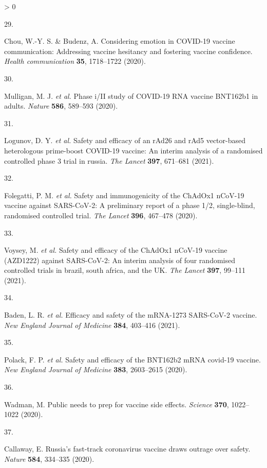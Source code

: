 \documentclass[
  12pt,
]{article}
\newlength{\cslhangindent}
\newlength{\csllabelwidth}
\newenvironment{CSLReferences}[2] %
 {%
  \setlength{\parindent}{0pt}
  \ifodd #1 \everypar{\setlength{\hangindent}{\cslhangindent}}\ignorespaces\fi
  \ifnum #2 > 0
  \setlength{\parskip}{#2\baselineskip}
  \fi
 }%
 {}
\newcommand{\CSLLeftMargin}[1]{\parbox[t]{\csllabelwidth}{#1}}
\newcommand{\CSLRightInline}[1]{\parbox[t]{\linewidth - \csllabelwidth}{#1}\break}
\begin{document}
\begin{CSLReferences}{0}{0}
\leavevmode\hypertarget{ref-chou2020considering}{}%
\CSLLeftMargin{29. }
\CSLRightInline{Chou, W.-Y. S. \& Budenz, A. Considering emotion in COVID-19 vaccine communication: Addressing vaccine hesitancy and fostering vaccine confidence. \emph{Health communication} \textbf{35}, 1718--1722 (2020).}

\leavevmode\hypertarget{ref-mulligan2020phase}{}%
\CSLLeftMargin{30. }
\CSLRightInline{Mulligan, M. J. \emph{et al.} Phase i/II study of COVID-19 RNA vaccine BNT162b1 in adults. \emph{Nature} \textbf{586}, 589--593 (2020).}

\leavevmode\hypertarget{ref-logunov2021safety}{}%
\CSLLeftMargin{31. }
\CSLRightInline{Logunov, D. Y. \emph{et al.} Safety and efficacy of an rAd26 and rAd5 vector-based heterologous prime-boost COVID-19 vaccine: An interim analysis of a randomised controlled phase 3 trial in russia. \emph{The Lancet} \textbf{397}, 671--681 (2021).}

\leavevmode\hypertarget{ref-folegatti2020safety}{}%
\CSLLeftMargin{32. }
\CSLRightInline{Folegatti, P. M. \emph{et al.} Safety and immunogenicity of the ChAdOx1 nCoV-19 vaccine against SARS-CoV-2: A preliminary report of a phase 1/2, single-blind, randomised controlled trial. \emph{The Lancet} \textbf{396}, 467--478 (2020).}

\leavevmode\hypertarget{ref-voysey2021safety}{}%
\CSLLeftMargin{33. }
\CSLRightInline{Voysey, M. \emph{et al.} Safety and efficacy of the ChAdOx1 nCoV-19 vaccine (AZD1222) against SARS-CoV-2: An interim analysis of four randomised controlled trials in brazil, south africa, and the UK. \emph{The Lancet} \textbf{397}, 99--111 (2021).}

\leavevmode\hypertarget{ref-baden2021efficacy}{}%
\CSLLeftMargin{34. }
\CSLRightInline{Baden, L. R. \emph{et al.} Efficacy and safety of the mRNA-1273 SARS-CoV-2 vaccine. \emph{New England Journal of Medicine} \textbf{384}, 403--416 (2021).}

\leavevmode\hypertarget{ref-polack2020safety}{}%
\CSLLeftMargin{35. }
\CSLRightInline{Polack, F. P. \emph{et al.} Safety and efficacy of the BNT162b2 mRNA covid-19 vaccine. \emph{New England Journal of Medicine} \textbf{383}, 2603--2615 (2020).}

\leavevmode\hypertarget{ref-wadman2020public}{}%
\CSLLeftMargin{36. }
\CSLRightInline{Wadman, M. Public needs to prep for vaccine side effects. \emph{Science} \textbf{370}, 1022--1022 (2020).}

\leavevmode\hypertarget{ref-callaway2020russia}{}%
\CSLLeftMargin{37. }
\CSLRightInline{Callaway, E. Russia's fast-track coronavirus vaccine draws outrage over safety. \emph{Nature} \textbf{584}, 334--335 (2020).}


\end{CSLReferences}
\end{document}

